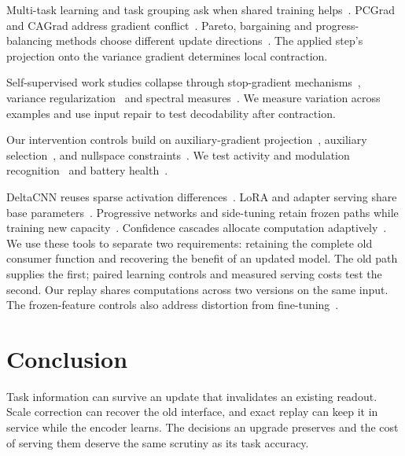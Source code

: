 \documentclass{article}
\begin{document}
Multi-task learning and task grouping ask when shared training
helps~\citep{caruana1997multitask,standley2020tasks}. PCGrad and CAGrad address
gradient conflict~\citep{yu2020pcgrad,liu2021cagrad}. Pareto, bargaining and
progress-balancing methods choose different update
directions~\citep{sener2018multi,navon2022multi,liu2023famo}. The applied
step's projection onto the variance gradient determines local contraction.

Self-supervised work studies collapse through stop-gradient
mechanisms~\citep{grill2020bootstrap,chen2021simsiam,caron2021emerging},
variance regularization~\citep{zbontar2021barlow,bardes2022vicreg,ermolov2021whitening}
and spectral measures~\citep{jing2022understanding,dong2021attention,kim2025taxonomy,garrido2023rankme}.
We measure variation across examples and use input repair to test
decodability after contraction.

Our intervention controls build on auxiliary-gradient projection~\citep{dery2021attittud,zhu2025gradops}, auxiliary selection~\citep{navon2021auxiliary,jiang2023forkmerge,shin2024dgr}, and nullspace
constraints~\citep{pham2026ness,fang2025alphaedit}. We test activity and
modulation recognition~\citep{ucihar,radioml} and battery health~\citep{nasa_battery,severson2019data,attia2020closed,pradhan2022soh}.

DeltaCNN reuses sparse activation differences~\citep{parger2022deltacnn}.
LoRA and adapter serving share base parameters~\citep{hu2022lora,chen2024punica,sheng2024slora}.
Progressive networks and side-tuning retain frozen paths
while training new capacity~\citep{rusu2016progressive,zhang2020sidetuning,sung2022lst}.
Confidence cascades allocate computation adaptively~\citep{bolukbasi2017adaptive}.
We use these tools to separate two requirements: retaining the complete
old consumer function and recovering the benefit of an updated model.
The old path supplies the first; paired learning controls and measured
serving costs test the second. Our replay shares computations across
two versions on the same input.
The frozen-feature controls also address distortion from
fine-tuning~\citep{kumar2022finetuning}.

\section{Conclusion}\label{sec:conclusion}

Task information can survive an update that invalidates an existing readout.
Scale correction can recover the old interface, and exact replay can keep
it in service while the encoder learns. The decisions an upgrade preserves
and the cost of serving them deserve the same scrutiny as its task accuracy.
\end{document}
